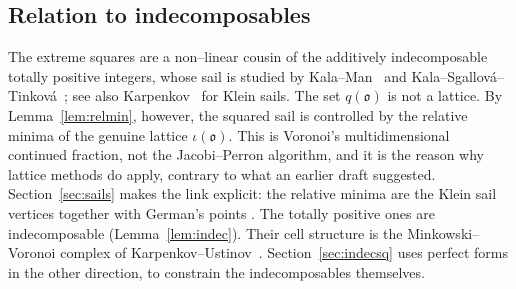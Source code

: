 \documentclass[11pt,reqno]{amsart}
\theoremstyle{plain}
\theoremstyle{definition}
\newcommand{\Ok}{\mathfrak{o}}
\begin{document}
\subsection{Relation to indecomposables}
The extreme squares are a non--linear cousin of the additively indecomposable totally positive integers,
whose sail is studied by Kala--Man~\cite{KalaMan} and Kala--Sgallov\'a--Tinkov\'a~\cite{KST}; see also
Karpenkov~\cite{Karpenkov} for Klein sails. The set $q(\Ok)$ is not a lattice. By Lemma~\ref{lem:relmin},
however, the squared sail is controlled by the relative minima of the genuine lattice $\iota(\Ok)$. This is
Voronoi's multidimensional continued fraction, not the Jacobi--Perron algorithm, and it is the reason why
lattice methods do apply, contrary to what an earlier draft suggested. Section~\ref{sec:sails} makes the
link explicit: the relative minima are the Klein sail vertices together with German's points
\cite{Bykovskii,German}. The totally positive ones are indecomposable (Lemma~\ref{lem:indec}). Their cell
structure is the Minkowski--Voronoi complex of Karpenkov--Ustinov~\cite{KU}. Section~\ref{sec:indecsq} uses
perfect forms in the other direction, to constrain the indecomposables themselves.
\end{document}
